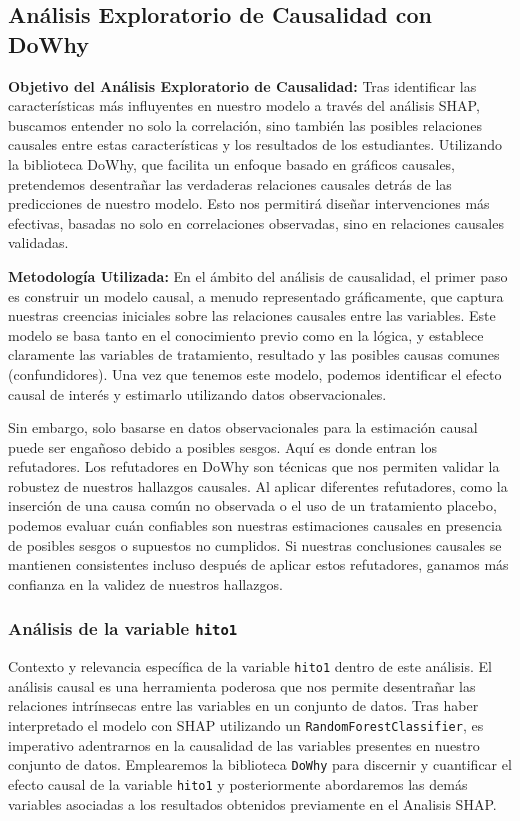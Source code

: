 \subsection{Análisis Exploratorio de Causalidad con DoWhy}

\textbf{Objetivo del Análisis Exploratorio de Causalidad:} Tras identificar las características más influyentes en nuestro modelo a través del análisis SHAP, buscamos entender no solo la correlación, sino también las posibles relaciones causales entre estas características y los resultados de los estudiantes. Utilizando la biblioteca DoWhy, que facilita un enfoque basado en gráficos causales, pretendemos desentrañar las verdaderas relaciones causales detrás de las predicciones de nuestro modelo. Esto nos permitirá diseñar intervenciones más efectivas, basadas no solo en correlaciones observadas, sino en relaciones causales validadas.

\textbf{Metodología Utilizada:} En el ámbito del análisis de causalidad, el primer paso es construir un modelo causal, a menudo representado gráficamente, que captura nuestras creencias iniciales sobre las relaciones causales entre las variables. Este modelo se basa tanto en el conocimiento previo como en la lógica, y establece claramente las variables de tratamiento, resultado y las posibles causas comunes (confundidores). Una vez que tenemos este modelo, podemos identificar el efecto causal de interés y estimarlo utilizando datos observacionales.

Sin embargo, solo basarse en datos observacionales para la estimación causal puede ser engañoso debido a posibles sesgos. Aquí es donde entran los refutadores. Los refutadores en DoWhy son técnicas que nos permiten validar la robustez de nuestros hallazgos causales. Al aplicar diferentes refutadores, como la inserción de una causa común no observada o el uso de un tratamiento placebo, podemos evaluar cuán confiables son nuestras estimaciones causales en presencia de posibles sesgos o supuestos no cumplidos. Si nuestras conclusiones causales se mantienen consistentes incluso después de aplicar estos refutadores, ganamos más confianza en la validez de nuestros hallazgos.

\subsubsection{Análisis de la variable \texttt{hito1}}
Contexto y relevancia específica de la variable \texttt{hito1} dentro de este análisis.
El análisis causal es una herramienta poderosa que nos permite desentrañar las relaciones intrínsecas entre las variables en un conjunto de datos. Tras haber interpretado el modelo con SHAP utilizando un \texttt{RandomForestClassifier}, es imperativo adentrarnos en la causalidad de las variables presentes en nuestro conjunto de datos. Emplearemos la biblioteca \texttt{DoWhy} para discernir y cuantificar el efecto causal de la variable \texttt{hito1} y posteriormente abordaremos las demás variables asociadas a los resultados obtenidos previamente en el Analisis SHAP.


